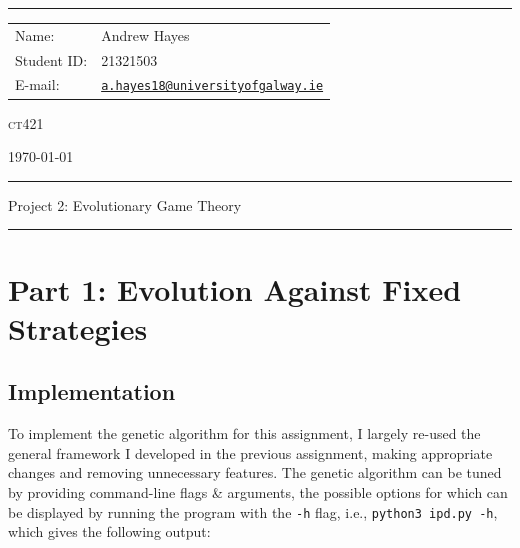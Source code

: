 \documentclass[a4paper]{article}
\begin{document}
\hrule \medskip
\begin{minipage}{0.295\textwidth} 
    \raggedright
    \footnotesize 
    \begin{tabular}{@{}l l}
        Name: & Andrew Hayes \\
        Student ID: & 21321503 \\
        E-mail: & \href{mailto://a.hayes18@universityofgalway.ie}{\texttt{a.hayes18@universityofgalway.ie}} \\
    \end{tabular}
\end{minipage}
\begin{minipage}{0.4\textwidth} 
    \centering 
    \vspace{0.4em}
    \LARGE
    \textsc{ct421} \\ 
\end{minipage}
\begin{minipage}{0.295\textwidth} 
    \raggedleft
    \today
\end{minipage}
\medskip\hrule 
\begin{center}
    \normalsize
    Project 2: Evolutionary Game Theory
\end{center}
\hrule
\medskip

\section{Part 1: Evolution Against Fixed Strategies}
\subsection{Implementation}
To implement the genetic algorithm for this assignment, I largely re-used the general framework I developed in the previous assignment, making appropriate changes and removing unnecessary features.
The genetic algorithm can be tuned by providing command-line flags \& arguments, the possible options for which can be displayed by running the program with the \texttt{-h} flag, i.e., 
\texttt{python3 ipd.py -h}, which gives the following output:
\end{document}
